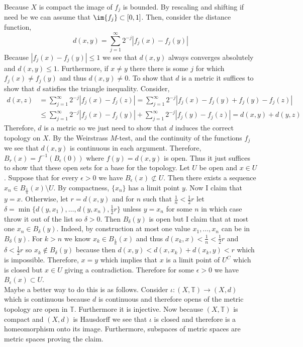 \documentclass[12pt]{article}
\renewcommand{\T}{\mathbb{T}}
\begin{document}
Because $X$ is compact the image of $f_j$ is bounded. By rescaling and shifting if need be we can assume that $\im{f_j} \subset [0,1]$. Then, consider the distance function,
\[ d(x,y) = \sum_{j = 1}^\infty 2^{-j} |f_j(x) - f_j(y)| \]
Because $|f_j(x) - f_j(y)| \le 1$ we see that $d(x, y)$ always converges absolutely and $d(x,y) \le 1$. Furthermore, if $x \neq y$ there there is some $j$ for which $f_j(x) \neq f_j(y)$ and thus $d(x, y) \neq 0$. To show that $d$ is a metric it suffices to show that $d$ satisfies the triangle inequality. Consider,
\begin{align*}
d(x, z) & = \sum_{j = 1}^\infty 2^{-j} |f_j(x) - f_j(z)| = \sum_{j = 1}^\infty 2^{-j} |f_j(x) - f_j(y) + f_j(y) - f_j(z)| 
\\
& \le \sum_{j = 1}^\infty 2^{-j} |f_j(x) - f_j(y)| + \sum_{j = 1}^\infty 2^{-j} |f_j(y) - f_j(z)| = d(x,y) + d(y,z) 
\end{align*}
Therefore, $d$ is a metric so we just need to show that $d$ induces the correct topology on $X$. By the Weirstrass $M$-test, and the continuity of the functions $f_j$ we see that $d(x,y)$ is continuous in each argument. Therefore, $B_r(x) = f^{-1}(B_\epsilon(0))$ where $f(y) = d(x,y)$ is open. Thus it just suffices to show that these open sets for a base for the topology. Let $U$ be open and $x \in U$. Suppose that for every $\epsilon > 0$ we have $B_\epsilon(x) \not\subset U$. Then there exists a sequence $x_n \in B_{\frac{1}{n}}(x) \setminus U$. By compactness, $\{ x_n \}$ has a limit point $y$. Now I claim that $y = x$. Otherwise, let $r = d(x,y)$ and for $n$ such that $\frac{1}{n} < \frac{1}{2} r$ let $\delta = \min \{ d(y, x_1), \dots, d(y, x_n), \frac{1}{2} r \}$ unless $y = x_n$ for some $n$ in which case throw it out of the list so $\delta > 0$. Then $B_\delta(y)$ is open but I claim that at most one $x_n \in B_\delta(y)$. Indeed, by construction at most one value $x_1, \dots, x_n$ can be in $B_\delta(y)$. For $k > n$ we know $x_k \in B_{\frac{1}{n}}(x)$ and thus $d(x_k, x) < \frac{1}{n} < \frac{1}{2} r$ and $\delta < \frac{1}{2} r$ so $x_k \notin B_\delta(y)$ because then $d(x, y) < d(x, x_k) + d(x_k, y) < r$ which is impossible. Therefore, $x = y$ which implies that $x$ is a limit point of $U^C$ which is closed but $x \in U$ giving a contradiction. Therefore for some $\epsilon > 0$ we have $B_\epsilon(x) \subset U$.
\bigskip\\
Maybe a better way to do this is as follows. Consider $\iota : (X, \T) \to (X, d)$ which is continuous because $d$ is continuous and therefore opens of the metric topology are open in $\T$. Furthermore it is injective. Now because $(X, \T)$ is compact and $(X, d)$ is Hausdorff we see that $\iota$ is closed and therefore is a homeomorphism onto its image. Furthermore, subspaces of metric spaces are metric spaces proving the claim.
\end{document}
